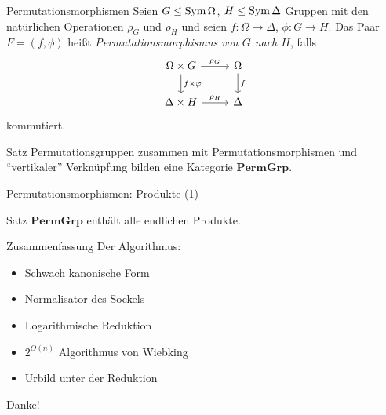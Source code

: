 \begin{frame}{Permutationsmorphismen}
Seien $G \leq \operatorname{Sym} \Omega$, $H \leq \operatorname{Sym} \Delta$ Gruppen
mit den natürlichen Operationen
$\rho_G$ und $\rho_H$
\pause
und
seien
$f : \Omega \to \Delta$, $\phi : G \to H$.
\pause
Das Paar $F = (f, \phi)$ heißt
\emph{Permutationsmorphismus von $G$ nach $H$},
falls
\[
\begin{tikzcd}[ampersand replacement=\&]
    \Omega \times G
        \ar[r, "\rho_G"]
        \ar[d, "f \times \varphi"]
    \&
    \Omega
        \ar[d, "f"]
    \\
    \Delta \times H
        \ar[r, "\rho_H"]
    \&
    \Delta
\end{tikzcd}
\]
kommutiert.

\pause
\begin{block}{Satz}
Permutationsgruppen zusammen mit Permutationsmorphismen und ``vertikaler''
Verknüpfung bilden eine Kategorie $\mathbf{PermGrp}$.
\end{block}
\end{frame}


\begin{frame}{Permutationsmorphismen: Produkte (1)}
\begin{block}{Satz}
$\mathbf{PermGrp}$ enthält alle endlichen Produkte.
\end{block}
\end{frame}

\begin{frame}{Zusammenfassung}
Der Algorithmus:
\begin{itemize}
\item Schwach kanonische Form
\item Normalisator des Sockels
\item Logarithmische Reduktion
\item $2 ^ {O(n)}$ Algorithmus von Wiebking
\item Urbild unter der Reduktion
\end{itemize}
\end{frame}

\begin{frame}[standout]
Danke!
\end{frame}

